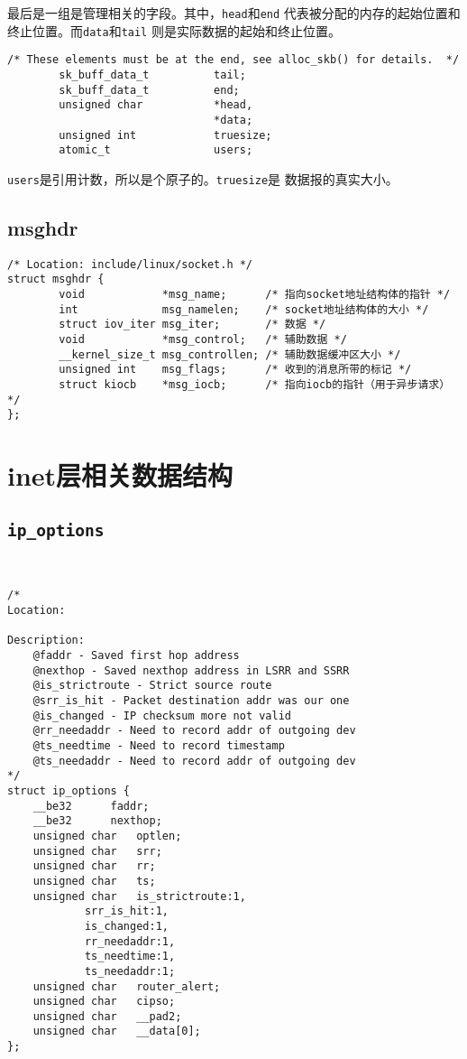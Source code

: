 最后是一组是管理相关的字段。其中，\texttt{head}和\texttt{end}
代表被分配的内存的起始位置和终止位置。而\texttt{data}和\texttt{tail}
则是实际数据的起始和终止位置。
\begin{verbatim}
/* These elements must be at the end, see alloc_skb() for details.  */
        sk_buff_data_t          tail;
        sk_buff_data_t          end;
        unsigned char           *head,
                                *data;
        unsigned int            truesize;
        atomic_t                users;
\end{verbatim}
\texttt{users}是引用计数，所以是个原子的。\texttt{truesize}是
数据报的真实大小。

\subsection{msghdr}
\begin{verbatim}
/* Location: include/linux/socket.h */
struct msghdr {
        void            *msg_name;      /* 指向socket地址结构体的指针 */
        int             msg_namelen;    /* socket地址结构体的大小 */
        struct iov_iter msg_iter;       /* 数据 */
        void            *msg_control;   /* 辅助数据 */
        __kernel_size_t msg_controllen; /* 辅助数据缓冲区大小 */
        unsigned int    msg_flags;      /* 收到的消息所带的标记 */
        struct kiocb    *msg_iocb;      /* 指向iocb的指针（用于异步请求） */
};
\end{verbatim}

    \section{inet层相关数据结构}
        \subsection{\texttt{ip_options}}

\begin{verbatim}


/*
Location:

Description:
    @faddr - Saved first hop address
    @nexthop - Saved nexthop address in LSRR and SSRR
    @is_strictroute - Strict source route
    @srr_is_hit - Packet destination addr was our one
    @is_changed - IP checksum more not valid
    @rr_needaddr - Need to record addr of outgoing dev
    @ts_needtime - Need to record timestamp
    @ts_needaddr - Need to record addr of outgoing dev
*/
struct ip_options {
    __be32      faddr;
    __be32      nexthop;
    unsigned char   optlen;
    unsigned char   srr;
    unsigned char   rr;
    unsigned char   ts;
    unsigned char   is_strictroute:1,
            srr_is_hit:1,
            is_changed:1,
            rr_needaddr:1,
            ts_needtime:1,
            ts_needaddr:1;
    unsigned char   router_alert;
    unsigned char   cipso;
    unsigned char   __pad2;
    unsigned char   __data[0];
};
\end{verbatim}    
